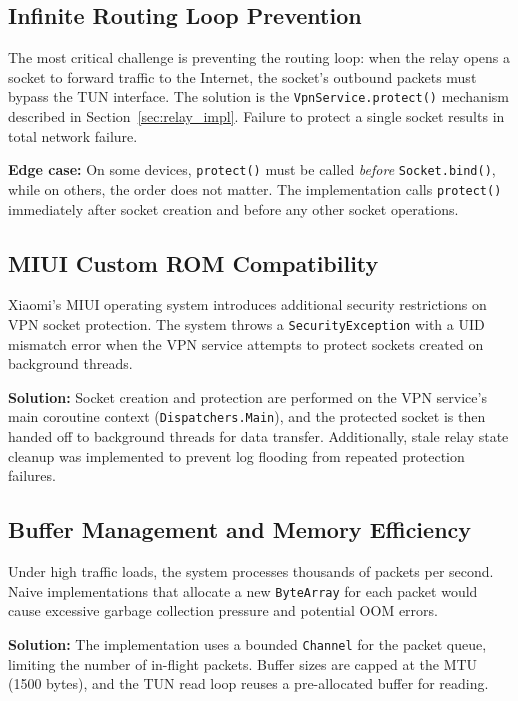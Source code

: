 \subsection{Infinite Routing Loop Prevention}

The most critical challenge is preventing the routing loop: when the relay opens a socket to forward traffic to the Internet, the socket's outbound packets must bypass the TUN interface. The solution is the \texttt{VpnService.protect()} mechanism described in Section~\ref{sec:relay_impl}. Failure to protect a single socket results in total network failure.

\textbf{Edge case:} On some devices, \texttt{protect()} must be called \textit{before} \texttt{Socket.bind()}, while on others, the order does not matter. The implementation calls \texttt{protect()} immediately after socket creation and before any other socket operations.

\subsection{MIUI Custom ROM Compatibility}

Xiaomi's MIUI operating system introduces additional security restrictions on VPN socket protection. The system throws a \texttt{SecurityException} with a UID mismatch error when the VPN service attempts to protect sockets created on background threads.

\textbf{Solution:} Socket creation and protection are performed on the VPN service's main coroutine context (\texttt{Dispatchers.Main}), and the protected socket is then handed off to background threads for data transfer. Additionally, stale relay state cleanup was implemented to prevent log flooding from repeated protection failures.

\subsection{Buffer Management and Memory Efficiency}

Under high traffic loads, the system processes thousands of packets per second. Naive implementations that allocate a new \texttt{ByteArray} for each packet would cause excessive garbage collection pressure and potential OOM errors.

\textbf{Solution:} The implementation uses a bounded \texttt{Channel} for the packet queue, limiting the number of in-flight packets. Buffer sizes are capped at the MTU (1500 bytes), and the TUN read loop reuses a pre-allocated buffer for reading.

